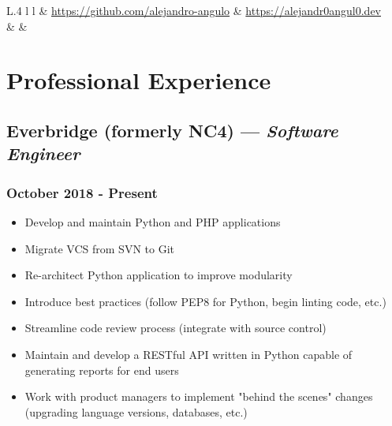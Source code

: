 \documentclass{article}
\begin{document}
\noindent
\begin{minipage}[t]{\textwidth}
\begin{tabular}{L{.4\textwidth} l l}
	 &  \href{https://github.com/alejandro-angulo}{https://github.com/alejandro-angulo} & \href{https://alejandr0angul0.dev}{https://alejandr0angul0.dev}\\
	& \href{mailto:\email}{\email} & \phonenumber\\
	\hline
\end{tabular}
\vspace{1em}
\end{minipage}
\begin{minipage}[t]{.8\textwidth}
\section*{Professional Experience}
\subsection*{Everbridge (formerly NC4) --- \textit{Software Engineer}}
\subsubsection*{October 2018 - Present}
\parbox[t]{.5\textwidth}{\raggedright%
\begin{itemize}
\vspace{-0.5em}
	\item Develop and maintain Python and PHP applications
	\item Migrate VCS from SVN to Git
	\item Re-architect Python application to improve modularity
	\item Introduce best practices (follow PEP8 for Python, begin linting code, etc.)
\end{itemize}}
\parbox[t]{.5\textwidth}{\raggedright%
\begin{itemize}
\vspace{-1.5em}
	\item Streamline code review process (integrate with source control)
	\item Maintain and develop a RESTful API written in Python capable of generating reports for end users
	\item Work with product managers to implement "behind the scenes" changes (upgrading language versions, databases, etc.)
\end{itemize}}
\vspace{-1.5em}

\end{minipage}
\end{document}
